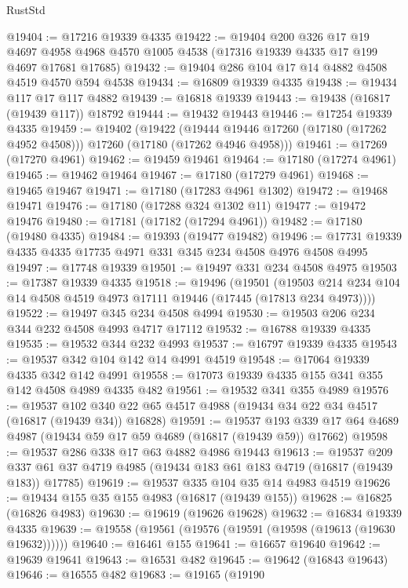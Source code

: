 \begin{lexlean}{RustStd}
\begin{coremodule}
@19404 := @17216 @19339 @4335
@19422 := @19404
    @200
    @326
    @17
    @19
    @4697
    @4958
    @4968
    @4570
    @1005
    @4538
    (@17316 @19339 @4335 @17 @199 @4697 @17681 @17685)
@19432 := @19404 @286 @104 @17 @14 @4882 @4508 @4519 @4570 @594 @4538
@19434 := @16809 @19339 @4335
@19438 := @19434 @117 @17 @117 @4882
@19439 := @16818 @19339
@19443 := @19438 (@16817 (@19439 @117)) @18792
@19444 := @19432 @19443
@19446 := @17254 @19339 @4335
@19459 := @19402
    (@19422
      (@19444 @19446 @17260 (@17180 (@17262 @4952 @4508)))
      @17260
      (@17180 (@17262 @4946 @4958)))
@19461 := @17269 (@17270 @4961)
@19462 := @19459 @19461
@19464 := @17180 (@17274 @4961)
@19465 := @19462 @19464
@19467 := @17180 (@17279 @4961)
@19468 := @19465 @19467
@19471 := @17180 (@17283 @4961 @1302)
@19472 := @19468 @19471
@19476 := @17180 (@17288 @324 @1302 @11)
@19477 := @19472 @19476
@19480 := @17181 (@17182 (@17294 @4961))
@19482 := @17180 (@19480 @4335)
@19484 := @19393 (@19477 @19482)
@19496 := @17731 @19339 @4335 @4335 @17735 @4971 @331 @345 @234 @4508 @4976 @4508 @4995
@19497 := @17748 @19339
@19501 := @19497 @331 @234 @4508 @4975
@19503 := @17387 @19339 @4335
@19518 := @19496
    (@19501
      (@19503 @214 @234 @104 @14 @4508 @4519 @4973 @17111 @19446 (@17445 (@17813 @234 @4973))))
@19522 := @19497 @345 @234 @4508 @4994
@19530 := @19503 @206 @234 @344 @232 @4508 @4993 @4717 @17112
@19532 := @16788 @19339 @4335
@19535 := @19532 @344 @232 @4993
@19537 := @16797 @19339 @4335
@19543 := @19537 @342 @104 @142 @14 @4991 @4519
@19548 := @17064 @19339 @4335 @342 @142 @4991
@19558 := @17073 @19339 @4335 @155 @341 @355 @142 @4508 @4989 @4335 @482
@19561 := @19532 @341 @355 @4989
@19576 := @19537
    @102
    @340
    @22
    @65
    @4517
    @4988
    (@19434 @34 @22 @34 @4517 (@16817 (@19439 @34)) @16828)
@19591 := @19537
    @193
    @339
    @17
    @64
    @4689
    @4987
    (@19434 @59 @17 @59 @4689 (@16817 (@19439 @59)) @17662)
@19598 := @19537 @286 @338 @17 @63 @4882 @4986 @19443
@19613 := @19537
    @209
    @337
    @61
    @37
    @4719
    @4985
    (@19434 @183 @61 @183 @4719 (@16817 (@19439 @183)) @17785)
@19619 := @19537 @335 @104 @35 @14 @4983 @4519
@19626 := @19434 @155 @35 @155 @4983 (@16817 (@19439 @155))
@19628 := @16825 (@16826 @4983)
@19630 := @19619 (@19626 @19628)
@19632 := @16834 @19339 @4335
@19639 := @19558 (@19561 (@19576 (@19591 (@19598 (@19613 (@19630 @19632))))))
@19640 := @16461 @155
@19641 := @16657 @19640
@19642 := @19639 @19641
@19643 := @16531 @482
@19645 := @19642 (@16843 @19643)
@19646 := @16555 @482
@19683 := @19165
    (@19190

\end{coremodule}
\end{lexlean}
